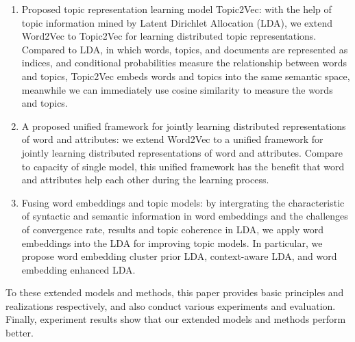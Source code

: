 \documentclass[master]{njuthesis}
\begin{document}
\begin{englishabstract}
\begin{enumerate}
\item Proposed topic representation learning model Topic2Vec: with the help of topic information mined by Latent Dirichlet Allocation (LDA), we extend Word2Vec to Topic2Vec for learning distributed topic representations. Compared to LDA, in which words, topics, and documents are represented as indices, and conditional probabilities measure the relationship between words and topics, Topic2Vec embeds words and topics into the same semantic space, meanwhile we can immediately use cosine similarity to measure the words and topics.
\item A proposed unified framework for jointly learning distributed representations of word and attributes: we extend Word2Vec to a unified framework for jointly learning distributed representations of word and attributes. Compare to capacity of single model, this unified framework has the benefit that word and attributes help each other during the learning process. 
\item Fusing word embeddings and topic models: by intergrating the characteristic of syntactic and semantic information in word embeddings and the challenges of convergence rate, results and topic coherence in LDA, we apply word embeddings into the LDA for improving topic models. In particular, we propose word embedding cluster prior LDA, context-aware LDA, and word embedding enhanced LDA.
\end{enumerate}
To these extended models and methods, this paper provides basic principles and realizations respectively, and also conduct various experiments and evaluation. Finally, experiment results show that our extended models and methods perform better.


\end{englishabstract}
\end{document}
